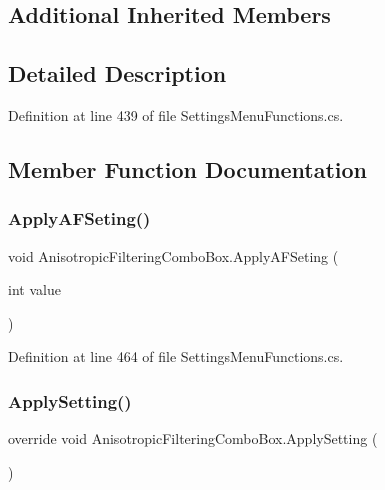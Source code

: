 \subsection*{Additional Inherited Members}


\subsection{Detailed Description}


Definition at line 439 of file Settings\+Menu\+Functions.\+cs.



\subsection{Member Function Documentation}
\mbox{\label{class_anisotropic_filtering_combo_box_a1fcf854f7e45693cd3df92fc2c269453}} 
\subsubsection{\texorpdfstring{Apply\+A\+F\+Seting()}{ApplyAFSeting()}}
{\footnotesize\ttfamily void Anisotropic\+Filtering\+Combo\+Box.\+Apply\+A\+F\+Seting (\begin{DoxyParamCaption}\item[{int}]{value }\end{DoxyParamCaption})}



Definition at line 464 of file Settings\+Menu\+Functions.\+cs.

\mbox{\label{class_anisotropic_filtering_combo_box_a6125f1d23556243c2b50ff1063cd8a3b}} 
\subsubsection{\texorpdfstring{Apply\+Setting()}{ApplySetting()}}
{\footnotesize\ttfamily override void Anisotropic\+Filtering\+Combo\+Box.\+Apply\+Setting (\begin{DoxyParamCaption}{ }\end{DoxyParamCaption})\hspace{0.3cm}{\ttfamily [virtual]}}



